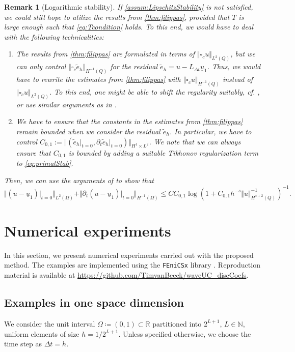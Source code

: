 \documentclass[sn-mathphys-num]{sn-jnl}
\newtheorem{rmk}{Remark}
\numberwithin{equation}{section}
\newcommand{\wop}{\square_c}
\newcommand{\ul}{\underline{u}}
\newcommand{\dt}{\partial_t}
\begin{document}
\begin{rmk}[Logarithmic stability]
    If \cref{assum:LipschitzStability} is not satisfied, we could still hope to utilize the results from \cref{thm:filippas}, provided that $T$ is large enough such that \eqref{eq:Tcondition} holds. To this end, we would have to deal with the following technicalities:  
    \begin{enumerate}
        \item The results from \cref{thm:filippas} are formulated in terms of $\Vert \wop u \Vert_{L^2(Q)}$, but we can only control $\Vert \wop \tilde{e}_h \Vert_{H^{-1}(Q)}$ for the residual $\tilde{e}_h = u - L_{\Delta t} \ul_1$. Thus, we would have to rewrite the estimates from \cref{thm:filippas} with $\Vert \wop u \Vert_{H^{-1}(Q)}$ instead of $\Vert \wop u \Vert_{L^2(Q)}$. To this end, one might be able to shift the regularity suitably, cf. \cite[Sec. 2.6]{StolkPhD}, or use similar arguments as in \cite[Thm. A.1]{BFMO21}.
        \item We have to ensure that the constants in the estimates from \cref{thm:filippas} remain bounded when we consider the residual $\tilde{e}_h$. In particular, we have to control $C_{0,1} := \Vert (\tilde{e}_h \vert_{t = 0}, \dt \tilde{e}_h \vert_{t = 0}) \Vert_{H^1 \times L^2}$. We note that we can always ensure that $C_{0,1}$ is bounded by adding a suitable Tikhonov regularization term to \eqref{eq:primalStab}. 
    \end{enumerate}
    Then, we can use the arguments of \cite[Theorem 14]{BP24} to show that 
    \begin{equation*}
	    \Vert (u - \ul_1) \vert_{t = 0} \Vert_{L^2(\Omega)}  + \Vert \dt (u - \ul_1) \vert_{t = 0} \Vert_{H^{-1}(\Omega)} \le C C_{0,1} \log(1 + C_{0,1} h^{-s} \Vert u \Vert_{H^{s+2}(Q)}^{-1})^{-1}. 
    \end{equation*}
\end{rmk}


\section{Numerical experiments}
In this section, we present numerical experiments carried out with the proposed method. The examples are implemented using the \texttt{FEniCSx} library \cite{BarattaEtal2023,BasixJoss,ScroggsEtal2022,AlnaesEtal2014}. Reproduction material is available at \url{https://github.com/TimvanBeeck/waveUC_discCoefs}.

\subsection{Examples in one space dimension}
 We consider the unit interval $\Omega \coloneqq (0,1) \subset \mathbb{R}$ partitioned into $2^{L+1}$, $L \in \mathbb{N}$, uniform elements of size $h = 1/2^{L+1}$. Unless specified otherwise, we choose the time step as $\Delta t = h$. 
\end{document}

